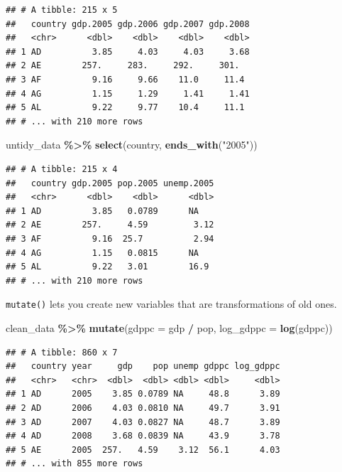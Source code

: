 \documentclass[
  12pt,
  oneside,openany]{book}
\newenvironment{Shaded}{\begin{snugshade}}{\end{snugshade}}
\newcommand{\DataTypeTok}[1]{\textcolor[rgb]{0.13,0.29,0.53}{#1}}
\newcommand{\KeywordTok}[1]{\textcolor[rgb]{0.13,0.29,0.53}{\textbf{#1}}}
\newcommand{\NormalTok}[1]{#1}
\newcommand{\OperatorTok}[1]{\textcolor[rgb]{0.81,0.36,0.00}{\textbf{#1}}}
\newcommand{\StringTok}[1]{\textcolor[rgb]{0.31,0.60,0.02}{#1}}
\begin{document}
\begin{verbatim}
## # A tibble: 215 x 5
##   country gdp.2005 gdp.2006 gdp.2007 gdp.2008
##   <chr>      <dbl>    <dbl>    <dbl>    <dbl>
## 1 AD          3.85     4.03     4.03     3.68
## 2 AE        257.     283.     292.     301.  
## 3 AF          9.16     9.66    11.0     11.4 
## 4 AG          1.15     1.29     1.41     1.41
## 5 AL          9.22     9.77    10.4     11.1 
## # ... with 210 more rows
\end{verbatim}

\begin{Shaded}
\begin{Highlighting}[]
\NormalTok{untidy\_data }\OperatorTok{\%>\%}
\StringTok{  }\KeywordTok{select}\NormalTok{(country, }\KeywordTok{ends\_with}\NormalTok{(}\StringTok{"2005"}\NormalTok{))}
\end{Highlighting}
\end{Shaded}

\begin{verbatim}
## # A tibble: 215 x 4
##   country gdp.2005 pop.2005 unemp.2005
##   <chr>      <dbl>    <dbl>      <dbl>
## 1 AD          3.85   0.0789      NA   
## 2 AE        257.     4.59         3.12
## 3 AF          9.16  25.7          2.94
## 4 AG          1.15   0.0815      NA   
## 5 AL          9.22   3.01        16.9 
## # ... with 210 more rows
\end{verbatim}

\texttt{mutate()} lets you create new variables that are transformations of old ones.

\begin{Shaded}
\begin{Highlighting}[]
\NormalTok{clean\_data }\OperatorTok{\%>\%}
\StringTok{  }\KeywordTok{mutate}\NormalTok{(}\DataTypeTok{gdppc =}\NormalTok{ gdp }\OperatorTok{/}\StringTok{ }\NormalTok{pop,}
         \DataTypeTok{log\_gdppc =} \KeywordTok{log}\NormalTok{(gdppc))}
\end{Highlighting}
\end{Shaded}

\begin{verbatim}
## # A tibble: 860 x 7
##   country year     gdp    pop unemp gdppc log_gdppc
##   <chr>   <chr>  <dbl>  <dbl> <dbl> <dbl>     <dbl>
## 1 AD      2005    3.85 0.0789 NA     48.8      3.89
## 2 AD      2006    4.03 0.0810 NA     49.7      3.91
## 3 AD      2007    4.03 0.0827 NA     48.7      3.89
## 4 AD      2008    3.68 0.0839 NA     43.9      3.78
## 5 AE      2005  257.   4.59    3.12  56.1      4.03
## # ... with 855 more rows
\end{verbatim}
\end{document}
